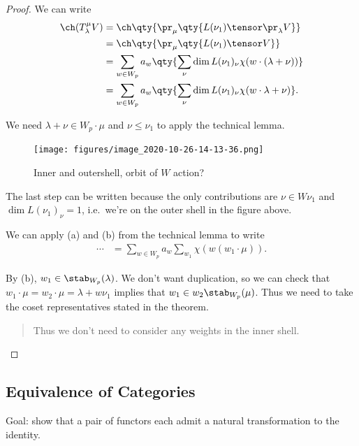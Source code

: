 \begin{proof}

We can write
\begin{align*}  
\ch(T_\lambda^\mu V)
&= \ch\qty{\pr_\mu\qty{L(\nu_1) \tensor \pr_\lambda V } } \\
&= \ch\qty{\pr_\mu\qty{L(\nu_1) \tensor V } } \\
&= \sum_{w\in W_p} a_w \qty{\sum_\nu \dim L(\nu_1)_\nu \chi(w\cdot(\lambda + \nu)) }\\
&= \sum_{w\in W_p} a_w  \qty{ \sum_\nu \dim L(\nu_1)_\nu \chi(w\cdot\lambda + \nu)  }
.\end{align*}

We need \(\lambda + \nu\in W_p\cdot \mu\) and \(\nu \leq \nu_1\) to
apply the technical lemma.

\begin{figure}
\centering
\texttt{[image: figures/image\_2020-10-26-14-13-36.png]}
\caption{Inner and outershell, orbit of \(W\) action?}
\end{figure}

The last step can be written because the only contributions are
\(\nu \in W\nu_1\) and \(\dim L(\nu_1)_\nu = 1\), i.e.~we're on the
outer shell in the figure above.

We can apply (a) and (b) from the technical lemma to write
\begin{align*}  
\cdots 
&= \sum_{w\in W_p} a_w \sum_{w_1} \chi(w(w_1\cdot \mu))
.\end{align*}

By (b), \(w_1 \in \stab_{W_p}(\lambda)\). We don't want duplication, so
we can check that \(w_1\cdot\mu = w_2 \cdot\mu = \lambda+ w\nu_1\)
implies that \(w_1 \in w_2 \stab_{W_p}(\mu)\). Thus we need to take the
coset representatives stated in the theorem.

\begin{quote}
Thus we don't need to consider any weights in the inner shell.
\end{quote}

\end{proof}

\hypertarget{equivalence-of-categories}{%
\subsection{Equivalence of Categories}\label{equivalence-of-categories}}

Goal: show that a pair of functors each admit a natural transformation
to the identity.

